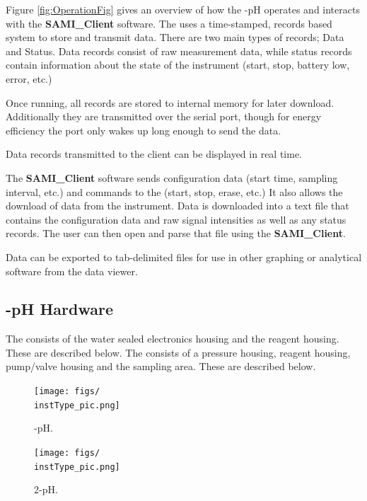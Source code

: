 Figure \ref{fig:OperationFig} gives an overview of how the \instType{}-pH operates and interacts with the \textbf{SAMI_Client} software.  The \instType{} uses a time-stamped, records based system to store and transmit data.  There are two main types of records; Data and Status.  Data records consist of raw measurement data, while status records contain information about the state of the instrument (start, stop, battery low, error, etc.)

Once running, all records are stored to internal memory for later download.  Additionally they are transmitted over the serial port, though for energy efficiency the port only wakes up long enough to send the data. 

Data records transmitted to the client can be displayed in real time.

The \textbf{SAMI_Client} software sends configuration data (start time, sampling interval, etc.) and commands to the \instType{} (start, stop, erase, etc.)  It also allows the download of data from the instrument.  Data is downloaded into a text file that contains the configuration data and raw signal intensities as well as any status records.  The user can then open and parse that file using the \textbf{SAMI_Client}.

Data can be exported to tab-delimited files for use in other graphing or analytical software from the data viewer.


\subsection{\instType{}-pH Hardware}

\ifiSAMI
    The \instType{} consists of the water sealed electronics housing and the reagent housing.  These are described below.
\else
    The \instType{} consists of a pressure housing, reagent housing, pump/valve housing and the sampling area.  These are described below.
\fi

\ifiSAMI
    \begin{figure}
    \centering
       \texttt{[image: figs/\\instType\_pic.png]}
    \caption{\instType{}-pH.}
    \label{fig:\instType{}pH}
    \end{figure}
\else
    \begin{figure}
    \centering
       \texttt{[image: figs/\\instType\_pic.png]}
    \caption{\instType{}2-pH.}
    \label{fig:\instType{}pH}
    \end{figure}
\fi


